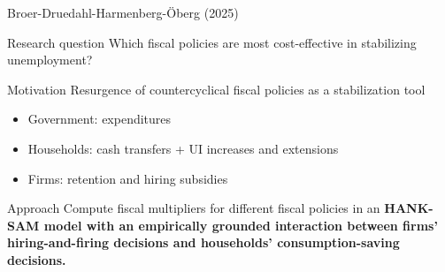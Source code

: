 \documentclass[9pt]{beamer}
\begin{document}
\begin{frame}{Broer-Druedahl-Harmenberg-{\"O}berg (2025)}

\begin{block}{Research question}
	Which fiscal policies are most cost-effective in stabilizing unemployment?
\end{block}


\begin{block}{Motivation}
	Resurgence of countercyclical fiscal policies as a stabilization tool
	\begin{itemize}
		\item Government: expenditures
		\item Households: cash transfers + UI increases and extensions
		\item Firms: retention and hiring subsidies
	\end{itemize}
\end{block}

\begin{block}{Approach}
	Compute fiscal multipliers for different fiscal policies in an \bf HANK-SAM \normalfont model with an empirically grounded interaction between firms' hiring-and-firing decisions and households' consumption-saving decisions. 
\end{block}


\end{frame}
\end{document}

